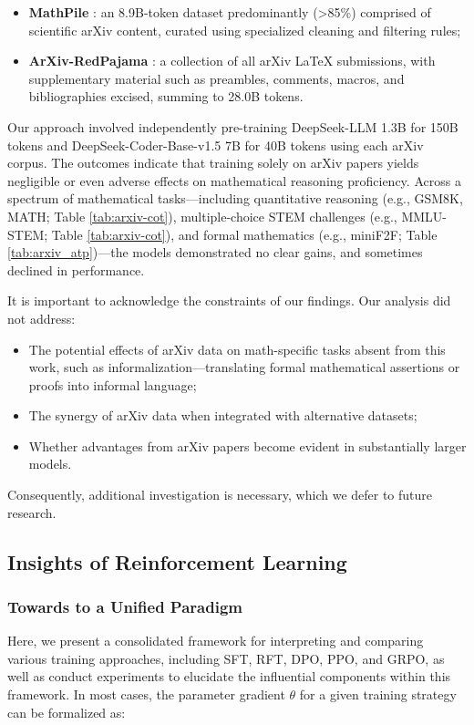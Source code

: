 \begin{itemize}[topsep=0pt]
    \item \textbf{MathPile} \citep{mathpile}: an 8.9B-token dataset predominantly (>85\%) comprised of scientific arXiv content, curated using specialized cleaning and filtering rules;
    \item \textbf{ArXiv-RedPajama} \citep{redpajama}: a collection of all arXiv LaTeX submissions, with supplementary material such as preambles, comments, macros, and bibliographies excised, summing to 28.0B tokens.
\end{itemize}

Our approach involved independently pre-training DeepSeek-LLM 1.3B for 150B tokens and DeepSeek-Coder-Base-v1.5 7B for 40B tokens using each arXiv corpus. The outcomes indicate that training solely on arXiv papers yields negligible or even adverse effects on mathematical reasoning proficiency. Across a spectrum of mathematical tasks—including quantitative reasoning (e.g., GSM8K, MATH; Table \ref{tab:arxiv-cot}), multiple-choice STEM challenges (e.g., MMLU-STEM; Table \ref{tab:arxiv-cot}), and formal mathematics (e.g., miniF2F; Table \ref{tab:arxiv_atp})—the models demonstrated no clear gains, and sometimes declined in performance.

It is important to acknowledge the constraints of our findings. Our analysis did not address:

\begin{itemize}[topsep=0pt]
    \item The potential effects of arXiv data on math-specific tasks absent from this work, such as informalization—translating formal mathematical assertions or proofs into informal language;
    \item The synergy of arXiv data when integrated with alternative datasets;
    \item Whether advantages from arXiv papers become evident in substantially larger models.
\end{itemize}

Consequently, additional investigation is necessary, which we defer to future research.

\subsection{Insights of Reinforcement Learning}
\subsubsection{Towards to a Unified Paradigm} Here, we present a consolidated framework for interpreting and comparing various training approaches, including SFT, RFT, DPO, PPO, and GRPO, as well as conduct experiments to elucidate the influential components within this framework. In most cases, the parameter gradient $\theta$ for a given training strategy can be formalized as:

